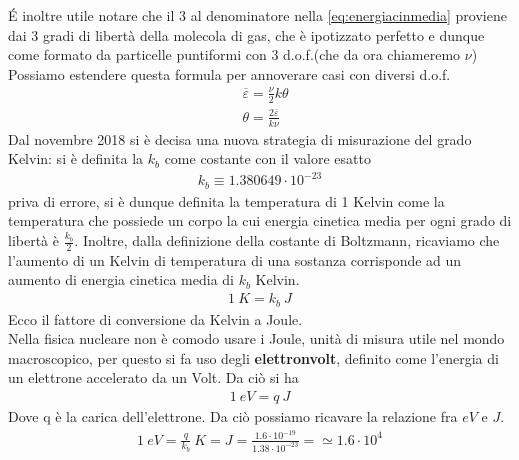 \documentclass[10pt,a4paper]{article}
\begin{document}
\'{E} inoltre utile notare che il 3 al denominatore nella \ref{eq:energiacinmedia} proviene dai 3 gradi di libertà della molecola di gas, che è ipotizzato perfetto e dunque come formato da particelle puntiformi con 3 d.o.f.(che da ora chiameremo $\nu$) Possiamo estendere questa formula per annoverare casi con diversi d.o.f.
\begin{align*}
	&\overline{\varepsilon} = \frac{\nu}{2} k \theta\\
	&\theta = \frac{2 \overline{\varepsilon}}{k \nu}
\end{align*}
Dal novembre 2018 si è decisa una nuova strategia di misurazione del grado Kelvin: si è definita la $k_b$ come costante con il valore esatto
\begin{align*}
	k_b \equiv 1.380649 \cdot 10^{-23}
\end{align*}
priva di errore, si è dunque definita la temperatura di 1 Kelvin come la temperatura che possiede un corpo la cui energia cinetica media per ogni grado di libertà è $\frac{k_b}{2}$. Inoltre, dalla definizione della costante di Boltzmann, ricaviamo che l'aumento di un Kelvin di temperatura di una sostanza corrisponde ad un aumento di energia cinetica media di $k_b$ Kelvin. 
\begin{align*}
	1\ K = k_b\ J
\end{align*} 
Ecco il fattore di conversione da Kelvin a Joule.\\
Nella fisica nucleare non è comodo usare i Joule, unità di misura utile nel mondo macroscopico, per questo si fa uso degli \textbf{elettronvolt}, definito come l'energia di un elettrone accelerato da un Volt. Da ciò si ha 
\begin{align*}
	1\ eV = q\ J
\end{align*}
Dove q è la carica dell'elettrone. Da ciò possiamo ricavare la relazione fra $eV$ e $J$.
\begin{align*}
	1\ eV = \frac{q}{k_b}\ K = J = \frac{1.6\cdot 10^{-19}}{1.38\cdot10^{-23}}=\simeq 1.6 \cdot 10^4
\end{align*}
\end{document}
